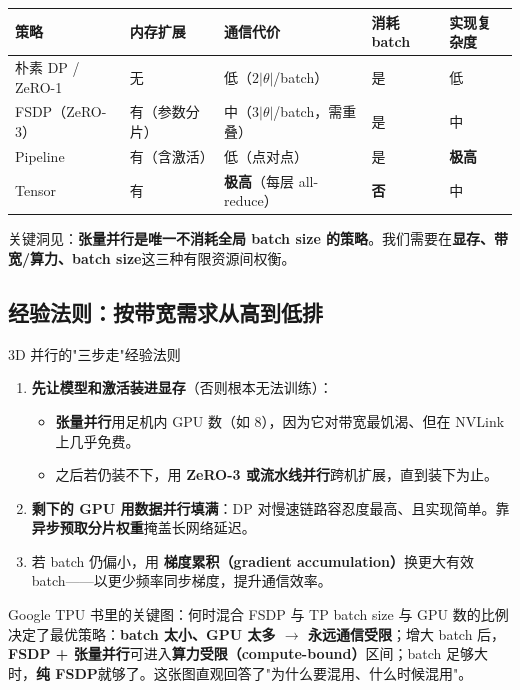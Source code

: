 \documentclass[a4paper]{article}
\begin{document}
\begin{tabular}{p{2.3cm}p{3cm}p{3cm}p{2.2cm}p{2.5cm}}
\toprule
\textbf{策略} & \textbf{内存扩展} & \textbf{通信代价} & \textbf{消耗 batch} & \textbf{实现复杂度} \\
\midrule
朴素 DP / ZeRO-1 & 无 & 低（$2|\theta|$/batch） & 是 & 低 \\
FSDP（ZeRO-3） & 有（参数分片） & 中（$3|\theta|$/batch，需重叠） & 是 & 中 \\
Pipeline & 有（含激活） & 低（点对点） & 是 & \textbf{极高} \\
Tensor & 有 & \textbf{极高}（每层 all-reduce） & \textbf{否} & 中 \\
\bottomrule
\end{tabular}

\vspace{0.3cm}
\noindent 关键洞见：\textbf{张量并行是唯一不消耗全局 batch size 的策略}。我们需要在\textbf{显存、带宽/算力、batch size}这三种有限资源间权衡。

\subsection{经验法则：按带宽需求从高到低排}

\begin{importantbox}{3D 并行的"三步走"经验法则}
\begin{enumerate}
\item \textbf{先让模型和激活装进显存}（否则根本无法训练）：
\begin{itemize}
\item \textbf{张量并行}用足机内 GPU 数（如 8），因为它对带宽最饥渴、但在 NVLink 上几乎免费。
\item 之后若仍装不下，用 \textbf{ZeRO-3 或流水线并行}跨机扩展，直到装下为止。
\end{itemize}
\item \textbf{剩下的 GPU 用数据并行填满}：DP 对慢速链路容忍度最高、且实现简单。靠\textbf{异步预取分片权重}掩盖长网络延迟。
\item 若 batch 仍偏小，用 \textbf{梯度累积（gradient accumulation）}换更大有效 batch——以更少频率同步梯度，提升通信效率。
\end{enumerate}
\end{importantbox}

\begin{knowledgebox}{Google TPU 书里的关键图：何时混合 FSDP 与 TP}
batch size 与 GPU 数的比例决定了最优策略：\textbf{batch 太小、GPU 太多 $\to$ 永远通信受限}；增大 batch 后，\textbf{FSDP + 张量并行}可进入\textbf{算力受限（compute-bound）}区间；batch 足够大时，\textbf{纯 FSDP}就够了。这张图直观回答了"为什么要混用、什么时候混用"。
\end{knowledgebox}
\end{document}
